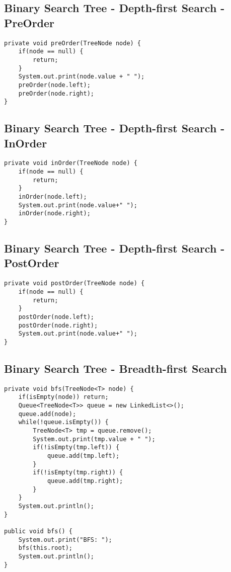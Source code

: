 \documentclass[10pt,letterpaper,twocolumn,twosided]{article}
\begin{document}
\subsection{Binary Search Tree - Depth-first Search - PreOrder}
\begin{lstlisting}
private void preOrder(TreeNode node) {
    if(node == null) {
        return;
    }
    System.out.print(node.value + " ");
    preOrder(node.left);
    preOrder(node.right);
}
\end{lstlisting}



\subsection{Binary Search Tree - Depth-first Search - InOrder}
\begin{lstlisting}
private void inOrder(TreeNode node) {
    if(node == null) {
        return;
    }
    inOrder(node.left);
    System.out.print(node.value+" ");
    inOrder(node.right);
}
\end{lstlisting}




\subsection{Binary Search Tree - Depth-first Search - PostOrder}
\begin{lstlisting}
private void postOrder(TreeNode node) {
    if(node == null) {
        return;
    }
    postOrder(node.left);
    postOrder(node.right);
    System.out.print(node.value+" ");
}
\end{lstlisting}




\subsection{Binary Search Tree - Breadth-first Search}
\begin{lstlisting}
private void bfs(TreeNode<T> node) {
    if(isEmpty(node)) return;
    Queue<TreeNode<T>> queue = new LinkedList<>();
    queue.add(node);
    while(!queue.isEmpty()) {
        TreeNode<T> tmp = queue.remove();
        System.out.print(tmp.value + " ");
        if(!isEmpty(tmp.left)) {
            queue.add(tmp.left);
        }
        if(!isEmpty(tmp.right)) {
            queue.add(tmp.right);
        }
    }
    System.out.println();
}

public void bfs() {
    System.out.print("BFS: ");
    bfs(this.root);
    System.out.println();
}
\end{lstlisting}
\end{document}
